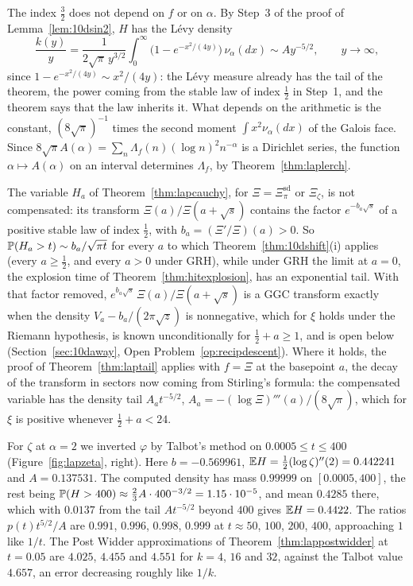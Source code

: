 The index $\frac32$ does not depend on $f$ or on $\alpha$. By Step~3 of the proof of Lemma~\ref{lem:10dsin2}, $H$ has the L\'evy density
\[
\frac{k(y)}y=\frac1{2\sqrt\pi\,y^{3/2}}\int_0^\infty\bigl(1-e^{-x^2/(4y)}\bigr)\,\nu_\alpha(dx)\sim Ay^{-5/2},\qquad y\to\infty,
\]
since $1-e^{-x^2/(4y)}\sim x^2/(4y)$: the L\'evy measure already has the tail of the theorem, the power coming from the stable law of index $\frac12$ in Step~1, and the theorem says that the law inherits it. What depends on the arithmetic is the constant, $(8\sqrt\pi)^{-1}$ times the second moment $\int x^2\nu_\alpha(dx)$ of the Galois face. Since $8\sqrt\pi A(\alpha)=\sum_n\Lambda_f(n)(\log n)^2n^{-\alpha}$ is a Dirichlet series, the function $\alpha\mapsto A(\alpha)$ on an interval determines $\Lambda_f$, by Theorem~\ref{thm:laplerch}.

The variable $H_a$ of Theorem~\ref{thm:lapcauchy}, for $\Xi=\Xi^{\mathrm{sd}}_\pi$ or $\Xi_\zeta$, is not compensated: its transform $\Xi(a)/\Xi(a+\sqrt s)$ contains the factor $e^{-b_a\sqrt s}$ of a positive stable law of index $\frac12$, with $b_a=(\Xi'/\Xi)(a)>0$. So $\mathbb{P}(H_a>t)\sim b_a/\sqrt{\pi t}$ for every $a$ to which Theorem~\ref{thm:10dshift}(i) applies (every $a\ge\frac12$, and every $a>0$ under GRH), while under GRH the limit at $a=0$, the explosion time of Theorem~\ref{thm:hitexplosion}, has an exponential tail. With that factor removed, $e^{b_a\sqrt s}\,\Xi(a)/\Xi(a+\sqrt s)$ is a GGC transform exactly when the density $V_a-b_a/(2\pi\sqrt z)$ is nonnegative, which for $\xi$ holds under the Riemann hypothesis, is known unconditionally for $\frac12+a\ge1$, and is open below (Section~\ref{sec:10daway}, Open Problem~\ref{op:recipdescent}). Where it holds, the proof of Theorem~\ref{thm:laptail} applies with $f=\Xi$ at the basepoint $a$, the decay of the transform in sectors now coming from Stirling's formula: the compensated variable has the density tail $A_at^{-5/2}$, $A_a=-(\log\Xi)'''(a)/(8\sqrt\pi)$, which for $\xi$ is positive whenever $\frac12+a<24$.

For $\zeta$ at $\alpha=2$ we inverted $\varphi$ by Talbot's method on $0.0005\le t\le400$ (Figure~\ref{fig:lapzeta}, right). Here $b=-0.569961$, $\mathbb{E} H=\frac12(\log\zeta)''(2)=0.442241$ and $A=0.137531$. The computed density has mass $0.99999$ on $[0.0005,400]$, the rest being $\mathbb{P}(H>400)\approx\frac23A\cdot400^{-3/2}=1.15\cdot10^{-5}$, and mean $0.4285$ there, which with $0.0137$ from the tail $At^{-5/2}$ beyond $400$ gives $\mathbb{E} H=0.4422$. The ratios $p(t)t^{5/2}/A$ are $0.991$, $0.996$, $0.998$, $0.999$ at $t\approx50$, $100$, $200$, $400$, approaching $1$ like $1/t$. The Post Widder approximations of Theorem~\ref{thm:lappostwidder} at $t=0.05$ are $4.025$, $4.455$ and $4.551$ for $k=4$, $16$ and $32$, against the Talbot value $4.657$, an error decreasing roughly like $1/k$.

